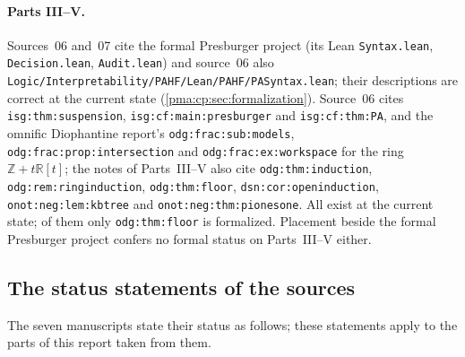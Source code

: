 \documentclass[11pt]{article}
\numberwithin{equation}{section}
\theoremstyle{definition}
\theoremstyle{remark}
\newcommand{\Z}{\mathbb Z}
\newcommand{\R}{\mathbb R}
\newcommand{\replabel}[1]{\nolinkurl{#1}}
\newcommand{\fn}[1]{\nolinkurl{#1}}
\begin{document}
\paragraph{Parts III--V.} Sources~06 and~07 cite the formal Presburger
project (its Lean \fn{Syntax.lean}, \fn{Decision.lean}, \fn{Audit.lean}) and
source~06 also \fn{Logic/Interpretability/PAHF/Lean/PAHF/PASyntax.lean}; their
descriptions are correct at the current state (\cref{pma:cp:sec:formalization}).
Source~06 cites \replabel{isg:thm:suspension}, \replabel{isg:cf:main:presburger}
and \replabel{isg:cf:thm:PA}, and the omnific Diophantine report's
\replabel{odg:frac:sub:models}, \replabel{odg:frac:prop:intersection} and
\replabel{odg:frac:ex:workspace} for the ring $\Z+t\R[t]$; the notes of
Parts~III--V also cite \replabel{odg:thm:induction},
\replabel{odg:rem:ringinduction}, \replabel{odg:thm:floor},
\replabel{dsn:cor:openinduction}, \replabel{onot:neg:lem:kbtree} and
\replabel{onot:neg:thm:pionesone}. All exist at the current state; of them
only \replabel{odg:thm:floor} is formalized. Placement beside the formal
Presburger project confers no formal status on Parts~III--V either.

\subsection{The status statements of the sources}\label{pma:sec:status}

The seven manuscripts state their status as follows; these statements apply
to the parts of this report taken from them.
\end{document}
